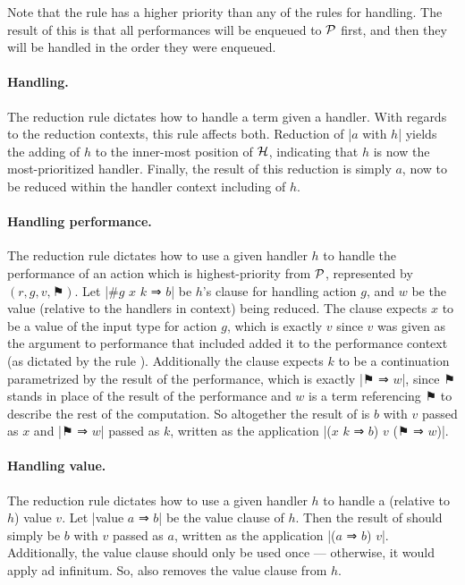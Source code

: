 Note that the rule  has a higher priority than any of the rules for handling.
The result of this is that all performances will be enqueued to $\mathcal{P}$ first,
and then they will be handled in the order they were enqueued.

\paragraph{Handling.}
The reduction rule  dictates how to handle a term given a handler.
With regards to the reduction contexts, this rule affects both.
Reduction of \code|$a$ with $h$| yields the adding of $h$ to the inner-most position of $\mathcal{H}$, indicating that $h$ is now the most-prioritized handler.
Finally, the result of this reduction is simply $a$, now to be reduced within the handler context including of $h$.

\paragraph{Handling performance.}
The reduction rule  dictates how to use a given handler $h$ to handle the performance of an action which is highest-priority from $\mathcal{P}$, represented by $(r,g,v,⚑)$.
Let \code|#$g$ $x$ $k$ ⇒ $b$| be $h$'s clause for handling action $g$,
and $w$ be the value (relative to the handlers in context) being reduced.
The clause expects $x$ to be a value of the input type for action $g$, which is exactly $v$ since $v$ was given as the argument to performance that included added it to the performance context (as dictated by the rule ).
Additionally the clause expects $k$ to be a continuation parametrized by the result of the performance, which is exactly \code|$⚑$ ⇒ $w$|, since $⚑$ stands in place of the result of the performance and $w$ is a term referencing $⚑$ to describe the rest of the computation.
So altogether the result of  is $b$ with $v$ passed as $x$ and \code|$⚑$ ⇒ $w$| passed as $k$,
written as the application \code|($x$ $k$ ⇒ $b$) $v$ ($⚑$ ⇒ $w$)|.

\paragraph{Handling value.}
The reduction rule  dictates how to use a given handler $h$ to handle a (relative to $h$) value $v$.
Let \code|value $a$ ⇒ $b$| be the value clause of $h$.
Then the result of  should simply be $b$ with $v$ passed as $a$,
written as the application \code|($a$ ⇒ $b$) $v$|.
Additionally, the value clause should only be used once --- otherwise, it would apply ad infinitum.
So,  also removes the value clause from $h$.

